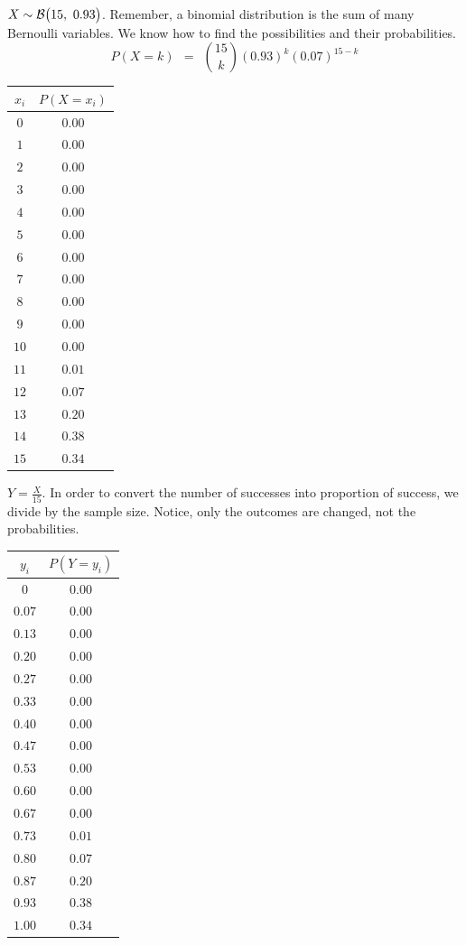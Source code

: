 \documentclass[12pt,letterpaper]{article}
\begin{document}
\begin{enumerate}
\begin{enumerate}
$X\sim \mathcal{B}\big(15,~0.93\big)$. Remember, a binomial distribution is the sum of many Bernoulli variables. We know how to find the possibilities and their probabilities. 
$$P(X=k) ~~=~~ {15 \choose k}(0.93)^{k}(0.07)^{15-k} $$


\begin{center}
\begin{tabular}{|c|c|}\hline
$x_i$ & $P(X=x_i)$ \\ \hline
$0$   &  $0.00$\\
$1$   &  $0.00$\\
$2$   &  $0.00$\\
$3$   &  $0.00$\\
$4$   &  $0.00$\\
$5$   &  $0.00$\\
$6$   &  $0.00$\\
$7$   &  $0.00$\\
$8$   &  $0.00$\\
$9$   &  $0.00$\\
$10$   &  $0.00$\\
$11$   &  $0.01$\\
$12$   &  $0.07$\\
$13$   &  $0.20$\\
$14$   &  $0.38$\\
$15$   &  $0.34$\\
\hline
\end{tabular}
\end{center}

$Y =  \frac{X}{15} $. In order to convert the number of successes into proportion of success, we divide by the sample size. Notice, only the outcomes are changed, not the probabilities.

\begin{center}
\begin{tabular}{|c|c|}\hline
$y_i$ & $P(Y=y_i)$ \\ \hline
$0$   &  $0.00$\\
$0.07$   &  $0.00$\\
$0.13$   &  $0.00$\\
$0.20$   &  $0.00$\\
$0.27$   &  $0.00$\\
$0.33$   &  $0.00$\\
$0.40$   &  $0.00$\\
$0.47$   &  $0.00$\\
$0.53$   &  $0.00$\\
$0.60$   &  $0.00$\\
$0.67$   &  $0.00$\\
$0.73$   &  $0.01$\\
$0.80$   &  $0.07$\\
$0.87$   &  $0.20$\\
$0.93$   &  $0.38$\\
$1.00$   &  $0.34$\\
\hline
\end{tabular}
\end{center}


\end{enumerate}
\end{enumerate}
\end{document}
